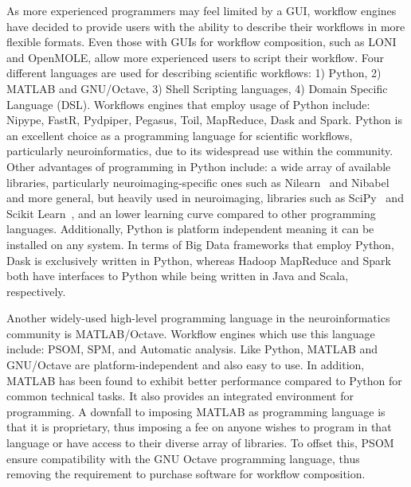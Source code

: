 \documentclass{report}
\begin{document}
            As more experienced programmers may feel limited by a GUI, workflow
            engines have decided to provide users with the ability to describe
            their workflows in more flexible formats. Even those with GUIs for 
            workflow composition, such as LONI and OpenMOLE, allow more 
            experienced users to script their workflow. Four different 
            languages are used for describing scientific workflows: 1) Python, 
            2) MATLAB and GNU/Octave, 3) Shell Scripting languages, 4) Domain Specific Language (DSL). Workflows engines that 
            employ usage of Python include: Nipype, FastR, Pydpiper, Pegasus, Toil,
            MapReduce, Dask and Spark.
            Python is an excellent choice as a programming language for 
            scientific workflows, particularly neuroinformatics, due to its 
            widespread use within the community. Other advantages of 
            programming in Python include: a wide array of available libraries,
            particularly neuroimaging-specific ones such as Nilearn~\cite{nilearn} and Nibabel~\cite{matthew_brett_2018_1287921}
            and more general, but heavily used in neuroimaging, libraries such
            as SciPy~\cite{scipy} and Scikit Learn~\cite{pedregosa2011scikit},
             and an lower learning curve compared to other 
            programming languages. Additionally, Python is platform independent
            meaning it can be installed on any system. In terms of Big Data 
            frameworks that employ Python, Dask is exclusively written in Python,
            whereas Hadoop MapReduce and Spark both have interfaces to Python
            while being written in Java and Scala, respectively.

            Another widely-used high-level programming language in the 
            neuroinformatics community is MATLAB/Octave. Workflow engines which
            use this language include: PSOM, SPM, and Automatic analysis. Like 
            Python, MATLAB and GNU/Octave are platform-independent and also easy to use. In addition, MATLAB has 
            been found to exhibit better performance compared to Python for 
            common technical tasks. It also provides an integrated environment
            for programming. A 
            downfall to imposing MATLAB as programming language is that it is proprietary, thus imposing a fee on 
            anyone wishes to program in that language or have access to their diverse array of libraries. 
            To offset this, PSOM ensure compatibility with the GNU 
            Octave programming language, thus 
            removing the requirement to purchase software for workflow 
            composition. 
\end{document}
